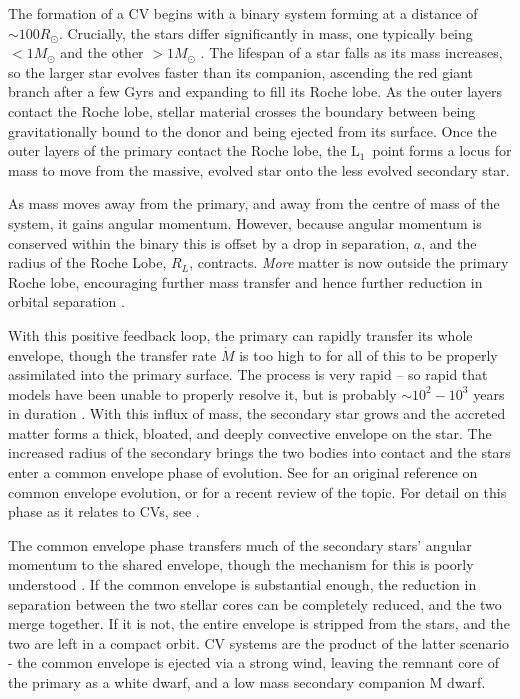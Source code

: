 The formation of a CV begins with a binary system forming at a distance of $\sim 100{R_\odot}$. Crucially, the stars differ significantly in mass, one typically being $<1{M_\odot}$ and the other $>1{M_\odot}$ \citep{Ritter2012}. The lifespan of a star falls as its mass increases, so the larger star evolves faster than its companion, ascending the red giant branch after a few Gyrs and expanding to fill its Roche lobe. 
As the outer layers contact the Roche lobe, stellar material crosses the boundary between being gravitationally bound to the donor and being ejected from its surface. 
Once the outer layers of the primary contact the Roche lobe, the $\mathrm L_1$\ point forms a locus for mass to move from the massive, evolved star onto the less evolved secondary star.

As mass moves away from the primary, and away from the centre of mass of the system, it gains angular momentum. However, because angular momentum is conserved within the binary this is offset by a drop in separation, $a$, and the radius of the Roche Lobe, ${R_L}$, contracts. \textit{More} matter is now outside the primary Roche lobe, encouraging further mass transfer and hence further reduction in orbital separation \citep{Ritter2008}.

With this positive feedback loop, the primary can rapidly transfer its whole envelope, though the transfer rate $\dot M$ is too high to for all of this to be properly assimilated into the primary surface. The process is very rapid -- so rapid that models have been unable to properly resolve it, but is probably $\sim 10^2 - 10^3$ years in duration \citep{Ritter2012}. With this influx of mass, the secondary star grows and the accreted matter forms a thick, bloated, and deeply convective envelope on the star. The increased radius of the secondary brings the two bodies into contact \citep{Ritter2008} and the stars enter a common envelope phase of evolution. See \citet{paczynski1976} for an original reference on common envelope evolution, or \citet{ivanova2020} for a recent review of the topic. For detail on this phase as it relates to CVs, see \citet{taam1978, webbink1984, zorotovic2010, passy2011}.

The common envelope phase transfers much of the secondary stars' angular momentum to the shared envelope, though the mechanism for this is poorly understood \citep{demarco2011}. If the common envelope is substantial enough, the reduction in separation between the two stellar cores can be completely reduced, and the two merge together. If it is not, the entire envelope is stripped from the stars, and the two are left in a compact orbit. CV systems are the product of the latter scenario - the common envelope is ejected via a strong wind, leaving the remnant core of the primary as a white dwarf, and a low mass secondary companion M dwarf. 

